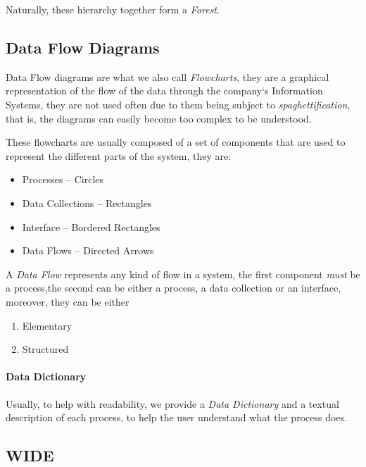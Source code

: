 \documentclass[openright, twoside, twocolumn]{report}
\begin{document}
    Naturally, these hierarchy together form a \emph{Forest}.

    \subsection{Data Flow Diagrams}

    Data Flow diagrams are what we also call \emph{Flowcharts}, they are a graphical
    representation of the flow of the data through the company`s Information Systems,
    they are not used often due to them being subject to \emph{spaghettification},
    that is, the diagrams can easily become too complex to be understood.

    These flowcharts are usually composed of a set of components that are used to represent
    the different parts of the system, they are:
    \begin{itemize}
      \item Processes -- Circles
      \item Data Collections -- Rectangles
      \item Interface -- Bordered Rectangles
      \item Data Flows -- Directed Arrows
    \end{itemize}

    \begin{definition}
      A \emph{Data Flow} represents any kind of flow in a system, the first component \emph{must}
      be a process,the second can be either a process, a data collection or an interface, moreover,
      they can be either
      \begin{enumerate}
        \item Elementary
        \item Structured
      \end{enumerate}
    \end{definition}

    \paragraph{Data Dictionary}

    Usually, to help with readability, we provide a \emph{Data Dictionary} and a textual description of each process,
    to help the user understand what the process does.

    \subsection{WIDE}
\end{document}
